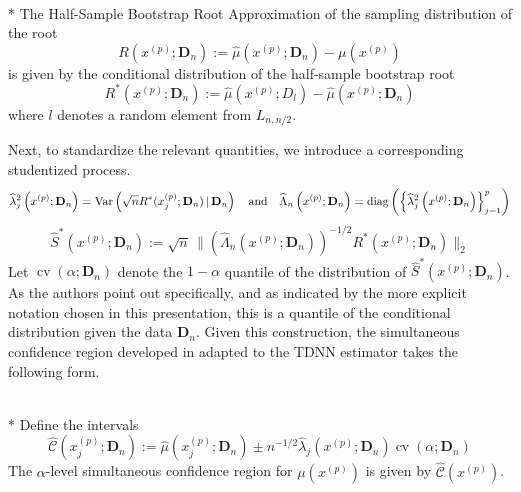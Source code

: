 \begin{boxD}
	\begin{dfn}\mbox{}\\*
		The Half-Sample Bootstrap Root Approximation of the sampling distribution of the root
		\begin{equation}
			R\left(x^{(p)}; \mathbf{D}_n\right)
			:= \hat{\mu}\left(x^{(p)}; \mathbf{D}_n\right) - \mu(x^{(p)})
		\end{equation}
		is given by the conditional distribution of the half-sample bootstrap root
		\begin{equation}
			R^{*}\left(x^{(p)}; \mathbf{D}_n\right)
			:= \hat{\mu}\left(x^{(p)}; D_l\right) - \hat{\mu}\left(x^{(p)}; \mathbf{D}_n\right)
		\end{equation}
		where $l$ denotes a random element from $L_{n, n/2}$.
	\end{dfn}
\end{boxD}

Next, to standardize the relevant quantities, we introduce a corresponding studentized process.
\begin{equation}
	\widehat{\lambda}_{j}^{2}\left(x^{(p)}; \mathbf{D}_n\right) = \text{Var}\left(\sqrt{n} R^{*}(x^{(p)}_{j}; \mathbf{D}_n) \, | \, \mathbf{D}_n\right)
	\quad \text{and} \quad
	\widehat{\Lambda}_n\left(x^{(p)}; \mathbf{D}_n\right) = \operatorname{diag}\left(\left\{\widehat{\lambda}_{j}^{2}\left(x^{(p)}; \mathbf{D}_n\right)\right\}_{j = 1}^{p}\right)
\end{equation}
\begin{equation}
	\hat{S}^{*}\left(x^{(p)}; \mathbf{D}_n\right)
	:= \sqrt{n} \, \Big\| \left(\hat{\Lambda}_n\left(x^{(p)}; \mathbf{D}_n\right)\right)^{-1/2} R^{*}\left(x^{(p)}; \mathbf{D}_n\right)\Big\|_{2}
\end{equation}
Let $\operatorname{cv}\left(\alpha; \mathbf{D}_n\right)$ denote the $1-\alpha$ quantile of the distribution of $\hat{S}^{*}\left(x^{(p)}; \mathbf{D}_n\right)$.
As the authors point out specifically, and as indicated by the more explicit notation chosen in this presentation, this is a quantile of the conditional distribution given the data $\mathbf{D}_n$.
Given this construction, the simultaneous confidence region developed in \citet{ritzwoller_simultaneous_2024} adapted to the TDNN estimator takes the following form.

\begin{boxD}
	\begin{thm}\mbox{}\\*
		Define the intervals
		\begin{equation}
			\hat{\mathcal{C}}\left(x^{(p)}_j; \mathbf{D}_n\right)
			:= \hat{\mu}\left(x^{(p)}_{j}; \mathbf{D}_n\right) \pm
			n^{-1/2} \hat{\lambda}_{j}\left(x^{(p)}; \mathbf{D}_n\right)\operatorname{cv}\left(\alpha; \mathbf{D}_n\right)
		\end{equation}
		The $\alpha$-level simultaneous confidence region for $\mu\left(x^{(p)}\right)$ is given by $\hat{\mathcal{C}}\left(x^{(p)}\right)$.
	\end{thm}
\end{boxD}

